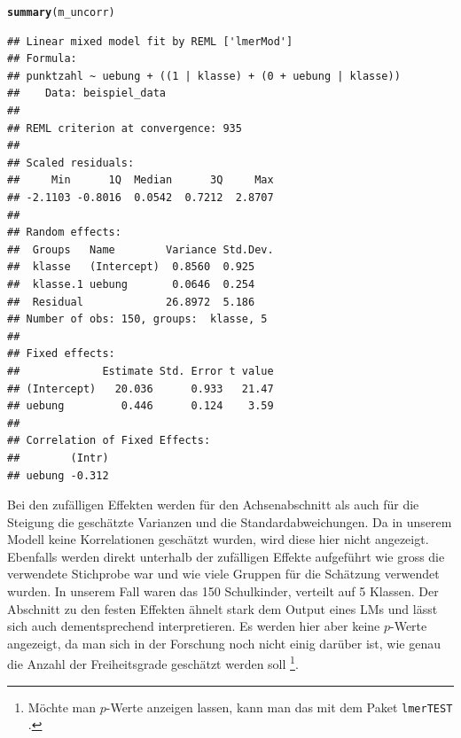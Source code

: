 \documentclass[12pt]{article}\usepackage[]{graphicx}\usepackage[]{color}
\makeatletter
\newcommand{\hlstd}[1]{\textcolor[rgb]{0.345,0.345,0.345}{#1}}%
\newcommand{\hlkwd}[1]{\textcolor[rgb]{0.737,0.353,0.396}{\textbf{#1}}}%
\newenvironment{kframe}{%
 \def\at@end@of@kframe{}%
 \ifinner\ifhmode%
  \def\at@end@of@kframe{\end{minipage}}%
  \begin{minipage}{\columnwidth}%
 \fi\fi%
 \def\FrameCommand##1{\hskip\@totalleftmargin \hskip-\fboxsep
 \colorbox{shadecolor}{##1}\hskip-\fboxsep
     \hskip-\linewidth \hskip-\@totalleftmargin \hskip\columnwidth}%
 \MakeFramed {\advance\hsize-\width
   \@totalleftmargin\z@ \linewidth\hsize
   \@setminipage}}%
 {\par\unskip\endMakeFramed%
 \at@end@of@kframe}
\newenvironment{knitrout}{}{} %
\makeatother
\begin{document}
\singlespacing
\begin{knitrout}
\color{fgcolor}\begin{kframe}
\begin{alltt}
\hlkwd{summary}\hlstd{(m_uncorr)}
\end{alltt}
\begin{verbatim}
## Linear mixed model fit by REML ['lmerMod']
## Formula: 
## punktzahl ~ uebung + ((1 | klasse) + (0 + uebung | klasse))
##    Data: beispiel_data
## 
## REML criterion at convergence: 935
## 
## Scaled residuals: 
##     Min      1Q  Median      3Q     Max 
## -2.1103 -0.8016  0.0542  0.7212  2.8707 
## 
## Random effects:
##  Groups   Name        Variance Std.Dev.
##  klasse   (Intercept)  0.8560  0.925   
##  klasse.1 uebung       0.0646  0.254   
##  Residual             26.8972  5.186   
## Number of obs: 150, groups:  klasse, 5
## 
## Fixed effects:
##             Estimate Std. Error t value
## (Intercept)   20.036      0.933   21.47
## uebung         0.446      0.124    3.59
## 
## Correlation of Fixed Effects:
##        (Intr)
## uebung -0.312
\end{verbatim}
\end{kframe}
\end{knitrout}


Bei den zufälligen Effekten werden für den Achsenabschnitt als auch für die Steigung die geschätzte Varianzen und die Standardabweichungen. Da in unserem Modell keine Korrelationen geschätzt wurden, wird diese hier nicht angezeigt. Ebenfalls werden direkt unterhalb der zufälligen Effekte aufgeführt wie gross die verwendete Stichprobe war und wie viele Gruppen für die Schätzung verwendet wurden. In unserem Fall waren das 150 Schulkinder, verteilt auf 5 Klassen. Der Abschnitt zu den festen Effekten ähnelt stark dem Output eines LMs und lässt sich auch dementsprechend interpretieren. Es werden hier aber keine $p$-Werte angezeigt, da man sich in der Forschung noch nicht einig darüber ist, wie genau die Anzahl der Freiheitsgrade geschätzt werden soll \citep{PEUGH201085,SnijdersTomA.B2012Ma:a}\footnote{Möchte man $p$-Werte anzeigen lassen, kann man das mit dem Paket \texttt{lmerTEST} \citep{lmertest}.}. 
\end{document}
